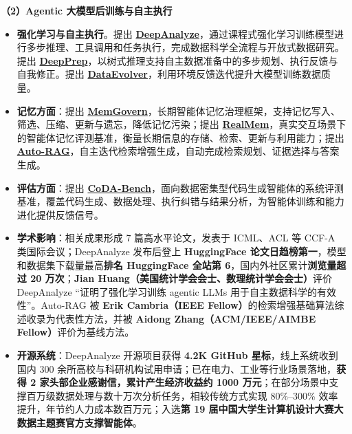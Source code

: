 \documentclass{resume}
\begin{document}
\textbf{\large \textcolor{red1}{（2）Agentic 大模型后训练与自主执行}}
\begin{itemize}[parsep=0.3ex]
\item \textbf{强化学习与自主执行}。提出 \textbf{\href{https://arxiv.org/abs/2510.16872}{DeepAnalyze}}，通过课程式强化学习训练模型进行多步推理、工具调用和任务执行，完成数据科学全流程与开放式数据研究。提出 \textbf{\href{https://arxiv.org/abs/2602.07371}{DeepPrep}}，以树式推理支持自主数据准备中的多步规划、执行反馈与自我修正。提出 \textbf{\href{https://zhangshaolei1998.github.io/}{DataEvolver}}，利用环境反馈迭代提升大模型训练数据质量。

\item \textbf{记忆方面}：提出 \textbf{\href{https://arxiv.org/abs/2601.06789}{MemGovern}}，长期智能体记忆治理框架，支持记忆写入、筛选、压缩、更新与遗忘，降低记忆污染；提出 \textbf{\href{https://arxiv.org/abs/2601.06966}{RealMem}}，真实交互场景下的智能体记忆评测基准，衡量长期信息的存储、检索、更新与利用能力；提出 \textbf{\href{https://arxiv.org/abs/2411.19443}{Auto-RAG}}，自主迭代检索增强生成，自动完成检索规划、证据选择与答案生成。

\item \textbf{评估方面}：提出 \textbf{\href{https://zhangshaolei1998.github.io/}{CoDA-Bench}}，面向数据密集型代码生成智能体的系统评测基准，覆盖代码生成、数据处理、执行纠错与结果分析，为智能体训练和能力进化提供反馈信号。

\item \textbf{\textcolor{red2}{学术影响}}：相关成果形成 7 篇高水平论文，发表于 ICML、ACL 等 CCF-A 类国际会议；DeepAnalyze 发布后登上 \textbf{HuggingFace 论文日趋榜第一}，模型和数据集下载量最高\textbf{排名 HuggingFace 全站第 6}，国内外社区累计\textbf{浏览量超过 20 万次}；\textbf{Jian Huang（美国统计学会会士、数理统计学会会士）}评价 DeepAnalyze “证明了强化学习训练 agentic LLMs 用于自主数据科学的有效性”。Auto-RAG 被 \textbf{Erik Cambria（IEEE Fellow）}的检索增强基础算法综述收录为代表性方法，并被 \textbf{Aidong Zhang（ACM/IEEE/AIMBE Fellow）}评价为基线方法。

\item \textbf{\textcolor{red2}{开源系统}}：DeepAnalyze 开源项目获得\textbf{ 4.2K GitHub 星标}，线上系统收到国内 300 余所高校与科研机构试用申请；已在电力、工业等行业场景落地，\textbf{获得 2 家头部企业感谢信，累计产生经济收益约 1000 万元}；在部分场景中支撑百万级数据处理与数十万次分析任务，相较传统方式实现 80\%--300\% 效率提升，年节约人力成本数百万元；入选\textbf{第 19 届中国大学生计算机设计大赛大数据主题赛官方支撑智能体}。
\end{itemize}
\end{document}
